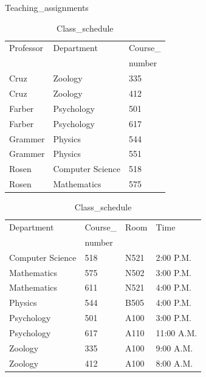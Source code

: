 \documentclass[11pt]{article}
\begin{document}
\begin{table}[!h]
    \begin{minipage}{.45\textwidth}
    \centering
    \caption{Teaching\_assignments}
    \begin{tabular}{|l|l|l|}
    \hline
        Professor & Department & Course\_ \\
        & & number \\ \hline
        Cruz & Zoology & 335 \\ \hline
        Cruz & Zoology & 412 \\ \hline
        Farber & Psychology & 501 \\ \hline
        Farber & Psychology & 617 \\ \hline
        Grammer & Physics & 544 \\ \hline
        Grammer & Physics & 551 \\ \hline
        Rosen & Computer Science & 518 \\ \hline
        Rosen & Mathematics & 575 \\ \hline
    \end{tabular}
        
    \end{minipage}%
    \begin{minipage}{.45\textwidth}
        \caption{Class\_schedule}
        \begin{tabular}{|l|l|l|l|}
        \hline
            Department & Course\_ & Room & Time \\
            & number & & \\ \hline
            Computer Science & 518 & N521 & 2:00 P.M. \\ \hline
            Mathematics & 575 & N502 & 3:00 P.M. \\ \hline
            Mathematics & 611 & N521 & 4:00 P.M. \\ \hline
            Physics & 544 & B505 & 4:00 P.M. \\ \hline
            Psychology & 501 & A100 & 3:00 P.M. \\ \hline
            Psychology & 617 & A110 & 11:00 A.M. \\ \hline
            Zoology & 335 & A100 & 9:00 A.M. \\ \hline
            Zoology & 412 & A100 & 8:00 A.M. \\ \hline
        \end{tabular}
    \end{minipage} 
\end{table}
\end{document}
